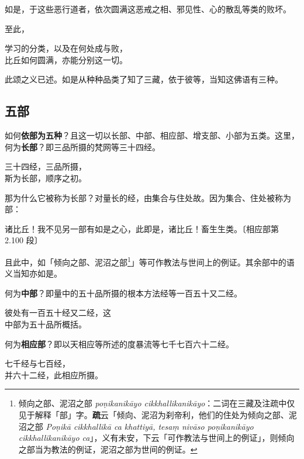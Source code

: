 如是，于这些恶行道者，依次圆满这恶戒之相、邪见性、心的散乱等类的败坏。

至此，

\begin{quoting}学习的分类，以及在何处成与败，\\比丘如何圆满，亦能分别这一切。\end{quoting}

此颂之义已述。如是从种种品类了知了三藏，依于彼等，当知这佛语有三种。

\subsection*{五部}

如何\textbf{依部为五种}？且这一切以长部、中部、相应部、增支部、小部为五类。这里，何为\textbf{长部}？即三品所摄的梵网等三十四经。

\begin{quoting}三十四经，三品所摄，\\斯为长部，顺序之初。\end{quoting}

那为什么它被称为长部？对量长的经，由集合与住处故。因为集合、住处被称为部：

\begin{quoting}诸比丘！我不见另一部有如是之心，此即是，诸比丘！畜生生类。{\bluefootnotesize 〔相应部第 2.100 段〕}\end{quoting}

且此中，如「倾向之部、泥沼之部\footnote{倾向之部、泥沼之部 \textit{poṇikanikāyo cikkhallikanikāyo}：二词在三藏及注疏中仅见于解释「部」字。\textbf{疏}云「倾向、泥沼为刹帝利，他们的住处为倾向之部、泥沼之部 \textit{Poṇikā cikkhallikā ca khattiyā, tesaṃ nivāso poṇikanikāyo cikkhallikanikāyo ca}」，义有未安，下云「可作教法与世间上的例证」，则倾向之部当为教法的例证，泥沼之部为世间的例证。}」等可作教法与世间上的例证。其余部中的语义当知亦如是。

何为\textbf{中部}？即量中的五十品所摄的根本方法经等一百五十又二经。

\begin{quoting}彼处有一百五十经又二经，这\\中部为五十品所概括。\end{quoting}

何为\textbf{相应部}？即以天相应等所述的度暴流等七千七百六十二经。

\begin{quoting}七千经与七百经，\\并六十二经，此相应所摄。\end{quoting}

